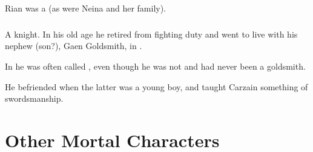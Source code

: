\subsubsection{\Tulan}
Rian was a  (as were Neina and her family).















\section[Weylon]{\Rah{\Weylon}}
\index{\rah[\Weylon]}
A  knight.
In his old age he retired from fighting duty and went to live with his nephew (son?), Gaen Goldsmith, in . 

In \Redglen{} he was often called , even though he was not and had never been a goldsmith. 

He befriended  when the latter was a young boy, and taught Carzain something of swordsmanship. 












































\part{Other Mortal Characters}























